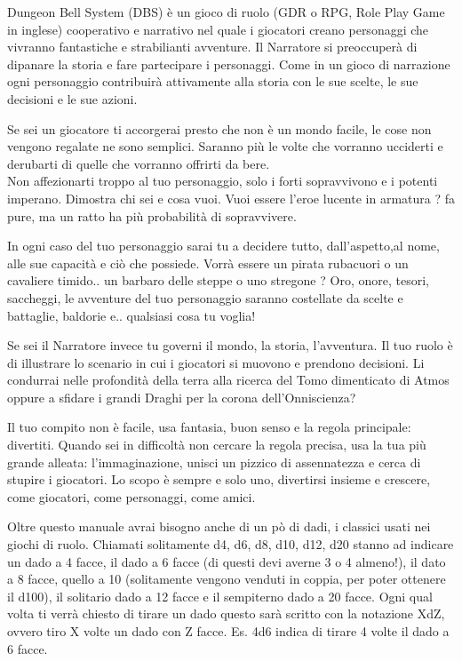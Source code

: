 \documentclass[10pt,a4paper]{article}
\begin{document}
Dungeon Bell System (DBS) è un gioco di ruolo (GDR o RPG, Role Play Game in inglese) cooperativo e narrativo nel quale i giocatori creano personaggi che vivranno fantastiche e strabilianti avventure. Il Narratore si preoccuperà di dipanare la storia e fare partecipare i personaggi. Come in un gioco di narrazione ogni personaggio contribuirà attivamente alla storia con le sue scelte, le sue decisioni e le sue azioni.

Se sei un giocatore ti accorgerai presto che non è un mondo facile, le cose non vengono regalate ne sono semplici. Saranno più le volte che vorranno ucciderti e derubarti di quelle che vorranno offrirti da bere.\\
Non affezionarti troppo al tuo personaggio, solo i forti sopravvivono e i potenti imperano. Dimostra chi sei e cosa vuoi. Vuoi essere l'eroe lucente in armatura ? fa pure, ma un ratto ha più probabilità di sopravvivere.

In ogni caso del tuo personaggio sarai tu a decidere tutto, dall'aspetto,al nome, alle sue capacità e ciò che possiede. Vorrà essere un pirata rubacuori o un cavaliere timido.. un barbaro delle steppe o uno stregone ? Oro, onore, tesori, saccheggi, le avventure del tuo personaggio saranno costellate da scelte e battaglie, baldorie e.. qualsiasi cosa tu voglia!

Se sei il Narratore invece tu governi il mondo,  la storia, l'avventura. Il tuo ruolo è di illustrare lo scenario in cui i giocatori si muovono e prendono decisioni. Li condurrai nelle profondità della terra alla ricerca del Tomo dimenticato di Atmos oppure a sfidare i grandi Draghi per la corona dell'Onniscienza?

Il tuo compito non è facile, usa fantasia, buon senso e la regola principale: divertiti. Quando sei in difficoltà non cercare la regola precisa, usa la tua più grande alleata: l'immaginazione, unisci un pizzico di assennatezza e cerca di stupire i giocatori. Lo scopo è sempre e solo uno, divertirsi insieme e crescere, come giocatori, come personaggi, come amici.

Oltre questo manuale avrai bisogno anche di un pò di dadi, i classici usati nei giochi di ruolo.
Chiamati solitamente d4, d6, d8, d10, d12, d20 stanno ad indicare un dado a 4 facce, il dado a 6 facce (di questi devi averne 3 o 4 almeno!), il dato a 8 facce, quello a 10 (solitamente vengono venduti in coppia, per poter ottenere il d100), il solitario dado a 12 facce e il sempiterno dado a 20 facce.
Ogni qual volta ti verrà chiesto di tirare un dado questo sarà scritto con la notazione XdZ, ovvero tiro X volte un dado con Z facce. Es. 4d6 indica di tirare 4 volte il dado a 6 facce.
\end{document}
